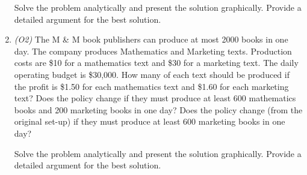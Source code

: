\documentclass[a4paper]{article}
\begin{document}
\begin{enumerate}
            Solve the problem analytically and present the solution graphically. Provide a
            detailed argument for the best solution.

      \item \textit{(O2)} The M \& M book publishers can produce at most 2000 books in one day. The company produces
            Mathematics and Marketing texts. Production costs are \$10 for a mathematics text and \$30 for a
            marketing text. The daily operating budget is \$30,000. How many of each text should be produced if
                  the profit is \$1.50 for each mathematics text and \$1.60 for each marketing text?
            Does the policy change if they must produce at least 600 mathematics books and 200 marketing
            books in one day? Does the policy change (from the original set-up) if they must produce at least 600
            marketing books in one day?

            Solve the problem analytically and present the solution graphically. Provide a
            detailed argument for the best solution.
\end{enumerate}

\end{document}
